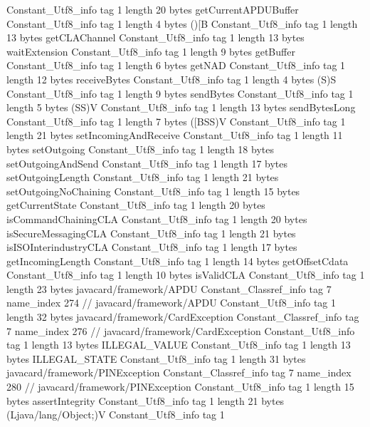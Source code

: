 {{{		}
		Constant_Utf8_info {
			tag	1
			length	20
			bytes	getCurrentAPDUBuffer
		}
		Constant_Utf8_info {
			tag	1
			length	4
			bytes	()[B
		}
		Constant_Utf8_info {
			tag	1
			length	13
			bytes	getCLAChannel
		}
		Constant_Utf8_info {
			tag	1
			length	13
			bytes	waitExtension
		}
		Constant_Utf8_info {
			tag	1
			length	9
			bytes	getBuffer
		}
		Constant_Utf8_info {
			tag	1
			length	6
			bytes	getNAD
		}
		Constant_Utf8_info {
			tag	1
			length	12
			bytes	receiveBytes
		}
		Constant_Utf8_info {
			tag	1
			length	4
			bytes	(S)S
		}
		Constant_Utf8_info {
			tag	1
			length	9
			bytes	sendBytes
		}
		Constant_Utf8_info {
			tag	1
			length	5
			bytes	(SS)V
		}
		Constant_Utf8_info {
			tag	1
			length	13
			bytes	sendBytesLong
		}
		Constant_Utf8_info {
			tag	1
			length	7
			bytes	([BSS)V
		}
		Constant_Utf8_info {
			tag	1
			length	21
			bytes	setIncomingAndReceive
		}
		Constant_Utf8_info {
			tag	1
			length	11
			bytes	setOutgoing
		}
		Constant_Utf8_info {
			tag	1
			length	18
			bytes	setOutgoingAndSend
		}
		Constant_Utf8_info {
			tag	1
			length	17
			bytes	setOutgoingLength
		}
		Constant_Utf8_info {
			tag	1
			length	21
			bytes	setOutgoingNoChaining
		}
		Constant_Utf8_info {
			tag	1
			length	15
			bytes	getCurrentState
		}
		Constant_Utf8_info {
			tag	1
			length	20
			bytes	isCommandChainingCLA
		}
		Constant_Utf8_info {
			tag	1
			length	20
			bytes	isSecureMessagingCLA
		}
		Constant_Utf8_info {
			tag	1
			length	21
			bytes	isISOInterindustryCLA
		}
		Constant_Utf8_info {
			tag	1
			length	17
			bytes	getIncomingLength
		}
		Constant_Utf8_info {
			tag	1
			length	14
			bytes	getOffsetCdata
		}
		Constant_Utf8_info {
			tag	1
			length	10
			bytes	isValidCLA
		}
		Constant_Utf8_info {
			tag	1
			length	23
			bytes	javacard/framework/APDU
		}
		Constant_Classref_info {
			tag	7
			name_index	274		// javacard/framework/APDU
		}
		Constant_Utf8_info {
			tag	1
			length	32
			bytes	javacard/framework/CardException
		}
		Constant_Classref_info {
			tag	7
			name_index	276		// javacard/framework/CardException
		}
		Constant_Utf8_info {
			tag	1
			length	13
			bytes	ILLEGAL_VALUE
		}
		Constant_Utf8_info {
			tag	1
			length	13
			bytes	ILLEGAL_STATE
		}
		Constant_Utf8_info {
			tag	1
			length	31
			bytes	javacard/framework/PINException
		}
		Constant_Classref_info {
			tag	7
			name_index	280		// javacard/framework/PINException
		}
		Constant_Utf8_info {
			tag	1
			length	15
			bytes	assertIntegrity
		}
		Constant_Utf8_info {
			tag	1
			length	21
			bytes	(Ljava/lang/Object;)V
		}
		Constant_Utf8_info {
			tag	1
}}}
